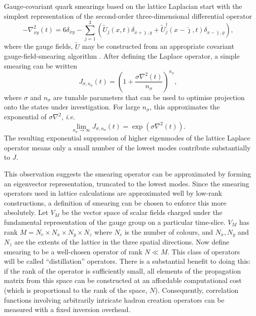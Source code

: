 Gauge-covariant quark smearings based on the lattice Laplacian start
with the simplest representation of the second-order three-dimensional
differential operator
\begin{equation}
   -\nabla^2_{xy}(t) = 6 \delta_{xy} - \sum_{j=1}^3
      \left(
	  \tilde{U}_j(x,t)         \delta_{x+\hat\jmath,y}
	 +\tilde{U}^\dagger_j(x-\hat\jmath,t) \delta_{x-\hat\jmath,y}
	  \right),
\end{equation}
where the gauge fields, $\tilde{U}$ may be constructed from an appropriate
covariant gauge-field-smearing algorithm \cite{Morningstar:2003gk}.
After defining the Laplace operator, a simple smearing can be written
\begin{equation}
  J_{\sigma, n_\sigma}(t) = \left( 1 + \frac{\sigma \nabla^2(t)}{n_\sigma} \right)^{n_\sigma},
  \label{eqn:smearing}
\end{equation}
where $\sigma$ and $n_\sigma$ are tunable parameters that can be used to
optimise projection onto the states under investigation.
For large $n_\sigma$, this approximates the exponential of $\sigma\nabla^2$,
{\it i.e.}
\begin{equation}
  \lim_{n_\sigma\rightarrow\infty} J_{\sigma, n_\sigma}(t) = \exp\left(\sigma
      \nabla^2(t)\right).
\label{eqn:jacobi}
\end{equation}
The resulting exponential suppression of higher eigenmodes of the lattice
Laplace operator means only a small number of the lowest modes contribute
substantially to $J$.

This observation suggests the smearing operator can be approximated
by forming an eigenvector representation, truncated to the lowest
modes.  Since the smearing operators used in lattice calculations are
approximated well by low-rank constructions, a definition of smearing can be
chosen to enforce this more absolutely.  Let $V_M$ be the vector space
of scalar fields charged under the fundamental representation of the gauge
group on a particular time-slice. $V_M$ has rank $M = N_c \times N_x \times
N_y \times N_z$ where $N_c$ is the number of colours, and $N_x,N_y$ and $N_z$
are the extents of the lattice in the three spatial directions.
Now define smearing to be a well-chosen operator of rank $N \ll M$.  This class
of operators will be called ``distillation'' operators.  There is a substantial
benefit to doing this: if the rank of the operator is sufficiently small, all
elements of the propagation matrix from this space can be constructed at an
affordable computational cost (which is proportional to the rank of the space, $N$).
Consequently, correlation functions involving arbitrarily intricate hadron
creation operators can be measured with a fixed inversion overhead.

